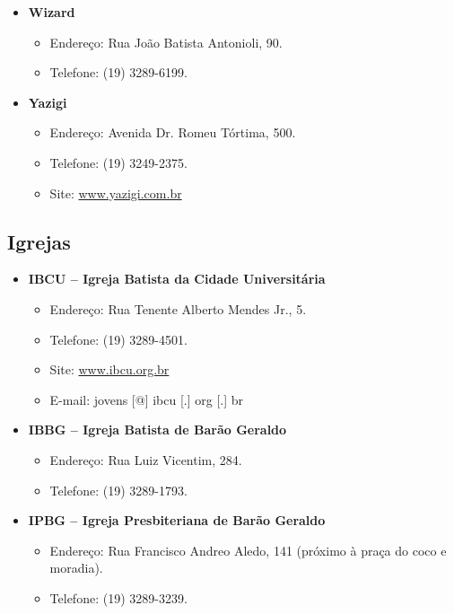 \begin{itemize}
\item  \textbf{Wizard}
\begin{itemize}
\item  Endereço: Rua João Batista Antonioli, 90.
\item  Telefone: (19) 3289-6199.
\end{itemize}
\end{itemize}

\begin{itemize}
\item  \textbf{Yazigi}
\begin{itemize}
\item  Endereço: Avenida Dr. Romeu Tórtima, 500.
\item  Telefone: (19) 3249-2375.
\item  Site: \url{www.yazigi.com.br}
\end{itemize}
\end{itemize}

\subsection{Igrejas}
\begin{itemize}
\item  \textbf{IBCU -- Igreja Batista da Cidade Universitária}
\begin{itemize}
\item  Endereço: Rua Tenente Alberto Mendes Jr., 5.
\item  Telefone: (19) 3289-4501.
\item  Site: \url{www.ibcu.org.br}
\item  E-mail: jovens [@] ibcu [.] org [.] br
\end{itemize}
\end{itemize}

\begin{itemize}
\item  \textbf{IBBG -- Igreja Batista de Barão Geraldo}
\begin{itemize}
\item  Endereço: Rua Luiz Vicentim, 284.
\item  Telefone: (19) 3289-1793.
\end{itemize}
\end{itemize}

\begin{itemize}
\item  \textbf{IPBG -- Igreja Presbiteriana de Barão Geraldo}
\begin{itemize}
\item  Endereço: Rua Francisco Andreo Aledo, 141 (próximo à praça do coco e moradia).
\item  Telefone: (19) 3289-3239.
\end{itemize}
\end{itemize}

